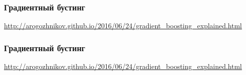 \documentclass{beamer}
\begin{document}
\begin{frame}\frametitle{Градиентный бустинг}
\begin{figure}[H]
\end{figure}
{\tiny \color{gray} \url{http://arogozhnikov.github.io/2016/06/24/gradient_boosting_explained.html}}
\end{frame}
\begin{frame}\frametitle{Градиентный бустинг}
\begin{figure}[H]
\end{figure}
{\tiny \color{gray} \url{http://arogozhnikov.github.io/2016/06/24/gradient_boosting_explained.html}}
\end{frame}
\end{document}
